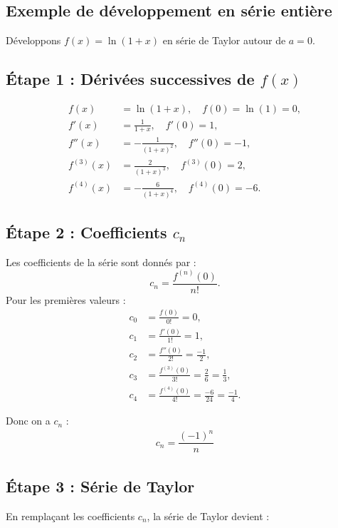 \documentclass{report}
\begin{document}
\begin{multicols*}{3}
    \section{Exemple de développement en série entière}
    Développons \( f(x) = \ln(1 + x) \) en série de Taylor autour de \(a = 0\).

    \subsection*{Étape 1 : Dérivées successives de \(f(x)\)}
    \begin{align*}
        f(x) &= \ln(1 + x), \quad f(0) = \ln(1) = 0, \\
        f'(x) &= \frac{1}{1 + x}, \quad f'(0) = 1, \\
        f''(x) &= -\frac{1}{(1 + x)^2}, \quad f''(0) = -1, \\
        f^{(3)}(x) &= \frac{2}{(1 + x)^3}, \quad f^{(3)}(0) = 2, \\
        f^{(4)}(x) &= -\frac{6}{(1 + x)^4}, \quad f^{(4)}(0) = -6.
    \end{align*}

    \subsection*{Étape 2 : Coefficients \(c_n\)}
    Les coefficients de la série sont donnés par :
    \[
    c_n = \frac{f^{(n)}(0)}{n!}.
    \]
    Pour les premières valeurs :
    \begin{align*}
        c_0 &= \frac{f(0)}{0!} = 0, \\
        c_1 &= \frac{f'(0)}{1!} = 1, \\
        c_2 &= \frac{f''(0)}{2!} = \frac{-1}{2}, \\
        c_3 &= \frac{f^{(3)}(0)}{3!} = \frac{2}{6} = \frac{1}{3}, \\
        c_4 &= \frac{f^{(4)}(0)}{4!} = \frac{-6}{24} = \frac{-1}{4}.
    \end{align*}

    Donc on a \( c_n \) : 
    \begin{align*}
                c_n =   \dfrac{(-1)^n}{n} 
    \end{align*}

    \subsection*{Étape 3 : Série de Taylor}
    En remplaçant les coefficients \(c_n\), la série de Taylor devient :
   

\end{multicols*}
\end{document}
